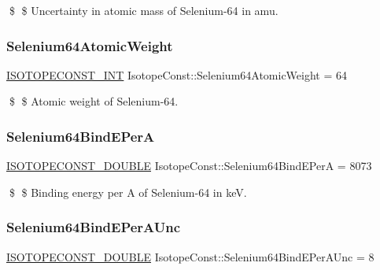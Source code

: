 \$ \$ Uncertainty in atomic mass of Selenium-\/64 in amu. \mbox{\label{group___isotope_const-_selenium-_se64_ga9c25ad9bc124c348a81db53fad4fbb5e}} 
\subsubsection{\texorpdfstring{Selenium64\+Atomic\+Weight}{Selenium64AtomicWeight}}
{\footnotesize\ttfamily \mbox{\hyperlink{group___isotope_const-_macros_ga5f18360b3e99483a35c32d789e62621c}{I\+S\+O\+T\+O\+P\+E\+C\+O\+N\+S\+T\+\_\+\+I\+NT}} Isotope\+Const\+::\+Selenium64\+Atomic\+Weight = 64}

\$ \$ Atomic weight of Selenium-\/64. \mbox{\label{group___isotope_const-_selenium-_se64_gad17fce59ba76fabc9b5101330be461e6}} 
\subsubsection{\texorpdfstring{Selenium64\+Bind\+E\+PerA}{Selenium64BindEPerA}}
{\footnotesize\ttfamily \mbox{\hyperlink{group___isotope_const-_macros_ga8f45a7272ce02c0b4c65c44636ed719a}{I\+S\+O\+T\+O\+P\+E\+C\+O\+N\+S\+T\+\_\+\+D\+O\+U\+B\+LE}} Isotope\+Const\+::\+Selenium64\+Bind\+E\+PerA = 8073}

\$ \$ Binding energy per A of Selenium-\/64 in keV. \mbox{\label{group___isotope_const-_selenium-_se64_gad4d2307480dbf832bcb880c080865702}} 
\subsubsection{\texorpdfstring{Selenium64\+Bind\+E\+Per\+A\+Unc}{Selenium64BindEPerAUnc}}
{\footnotesize\ttfamily \mbox{\hyperlink{group___isotope_const-_macros_ga8f45a7272ce02c0b4c65c44636ed719a}{I\+S\+O\+T\+O\+P\+E\+C\+O\+N\+S\+T\+\_\+\+D\+O\+U\+B\+LE}} Isotope\+Const\+::\+Selenium64\+Bind\+E\+Per\+A\+Unc = 8}

